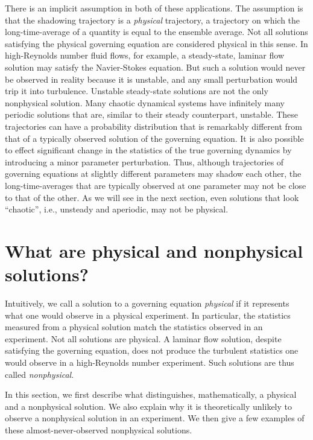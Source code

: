 There is an implicit assumption in both of these applications.  The assumption is that
the shadowing trajectory is a \emph{physical} trajectory, a trajectory on which
the long-time-average of a quantity is equal to the ensemble average.
Not all solutions satisfying the physical governing equation are considered physical in this sense.  In high-Reynolds number fluid flows, for example, a steady-state, laminar flow solution may satisfy the Navier-Stokes equation. But such a solution would never be observed in reality because it is unstable, and any small perturbation
would trip it into turbulence. Unstable steady-state solutions are not the only
nonphysical solution. Many chaotic dynamical systems have infinitely many periodic
solutions that are, similar to their steady counterpart, unstable. These trajectories can have a probability distribution that is remarkably different from that of a typically observed solution of the governing equation. It is also possible to effect significant change in the statistics of the true governing dynamics by introducing a minor parameter perturbation. Thus, although trajectories of governing equations at slightly different parameters may shadow each other, the long-time-averages that are typically observed at one parameter may not be close to that of the other.    
As we will see
in the next section, even solutions that look ``chaotic'', i.e., unsteady and aperiodic, may not be physical. 

\section{What are physical and nonphysical solutions?}
\label{sec:nonphysical}
Intuitively, we call a solution to a governing equation \emph{physical} if
it represents what one would observe in a physical experiment.  In particular, the statistics measured from a physical solution match the statistics observed
in an experiment.   Not all solutions are physical.  A laminar flow
solution, despite satisfying the governing equation, does not produce the
turbulent statistics one would observe in a high-Reynolds number experiment. Such solutions are thus called \emph{nonphysical}.

In this section, we first describe what distinguishes, mathematically, a physical
and a nonphysical solution.  We also explain why it is theoretically unlikely
to observe a nonphysical solution in an experiment.  We then give a few
examples of these almost-never-observed nonphysical solutions.

